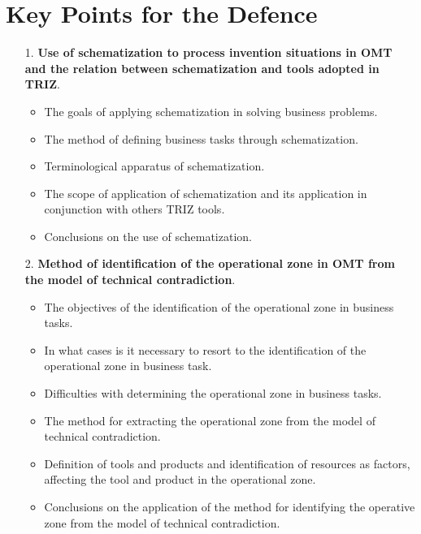 \documentclass[11pt,a4paper]{book}
\begin{document}
\section{Key Points for the Defence}
\begin{itemize}
\item [1.] \textbf{Use of schematization to process invention situations in
  OMT and the relation between schematization and
  tools adopted in TRIZ}.
  \begin{itemize}
  \item The goals of applying schematization in solving business problems.
  \item The method of defining business tasks through schematization.
  \item Terminological apparatus of schematization.
  \item The scope of application of schematization and its application in
    conjunction with others TRIZ tools.
  \item Conclusions on the use of schematization.
  \end{itemize}
\item [2.] \textbf{Method of identification of the operational zone in OMT
  from the model of technical contradiction}.
  \begin{itemize}
  \item The objectives of the identification of the operational zone in
    business tasks.
  \item In what cases is it necessary to resort to the identification of the
    operational zone in business task.
  \item Difficulties with determining the operational zone in business tasks.
  \item The method for extracting the operational zone from the model of
    technical contradiction.
  \item Definition of tools and products and identification of resources as
    factors, affecting the tool and product in the operational zone.
  \item Conclusions on the application of the method for identifying the
    operative zone from the model of technical contradiction.
  \end{itemize}
\end{itemize}
\end{document}
